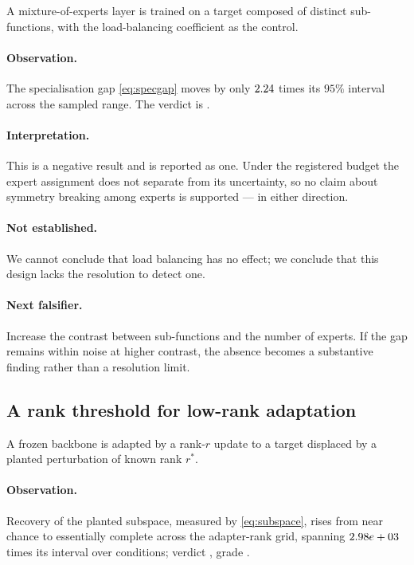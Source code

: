 A mixture-of-experts layer is trained on a target composed of distinct
sub-functions, with the load-balancing coefficient as the control.

\paragraph{Observation.} The specialisation gap \eqref{eq:specgap} moves by only
$2.24{}$ times its $95\%$ interval across the
sampled range. The verdict is \emph{\AtlasMoeSpecializationVerdict{}}.

\paragraph{Interpretation.} This is a negative result and is reported as one.
Under the registered budget the expert assignment does not separate from its
uncertainty, so no claim about symmetry breaking among experts is supported ---
in either direction.

\paragraph{Not established.} We cannot conclude that load balancing has no
effect; we conclude that this design lacks the resolution to detect one.

\paragraph{Next falsifier.} Increase the contrast between sub-functions and the
number of experts. If the gap remains within noise at higher contrast, the
absence becomes a substantive finding rather than a resolution limit.

\subsection{A rank threshold for low-rank adaptation}

A frozen backbone is adapted by a rank-$r$ update to a target displaced by a
planted perturbation of known rank $r^\ast$.

\paragraph{Observation.} Recovery of the planted subspace, measured by
\eqref{eq:subspace}, rises from near chance to essentially complete across the
adapter-rank grid, spanning
$2.98e+03{}$ times its interval over
\AtlasLoraRankConditions{} conditions; verdict \emph{\AtlasLoraRankVerdict{}},
grade \AtlasLoraRankGrade{}.

